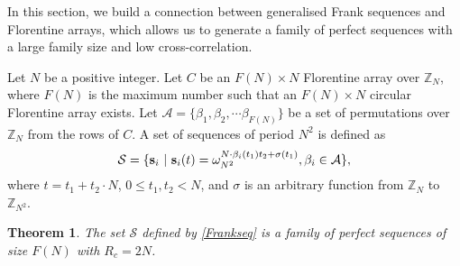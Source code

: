 \documentclass[conference,letterpaper]{IEEEtran}
\newtheorem{theorem}{Theorem}
\theoremstyle{definition}
\begin{document}
In this section, we build a connection between generalised Frank sequences and  Florentine arrays, which allows us to generate a family of perfect sequences with  a large family size and low cross-correlation.


Let $N$ be a positive integer. Let $C$ be an $F(N) \times N$  Florentine array over $ \mathbb{Z}_{N}$,  where 
$F(N)$ is the maximum number such that an $F(N) \times N$ circular Florentine array exists.  Let $\mathcal{A}=\{\beta_{1}, \beta_{2},  \cdots \beta_{F(N)}\}$ be a set of permutations over $ \mathbb{Z}_{N}$ from the rows of $C$.   A set of sequences of period $N^2$ is defined as
\begin{equation} \label{Frankseq}
\mathcal{S} = \{  {\bf s}_{i} ~\vert~ {\bf s}_{i}(t) = \omega_{N^2}^{N \cdot \beta_i(t_{1}) t_{2} + \sigma(t_{1})}, \beta_i \in \mathcal{A} \},
\end{equation}
 where $t=t_{1}+t_{2}\cdot N$, $0 \leq t_{1}, t_{2}  < N$, and $\sigma$ is an arbitrary function from $\mathbb{Z}_{N}$ to  $\mathbb{Z}_{N^2}$.



\begin{theorem} \label{maintheorem} 
The  set $\mathcal{S}$  defined by \eqref{Frankseq} is a family of perfect sequences of size $F(N)$  with $R_{c} = 2N$.
\end{theorem}
\end{document}
